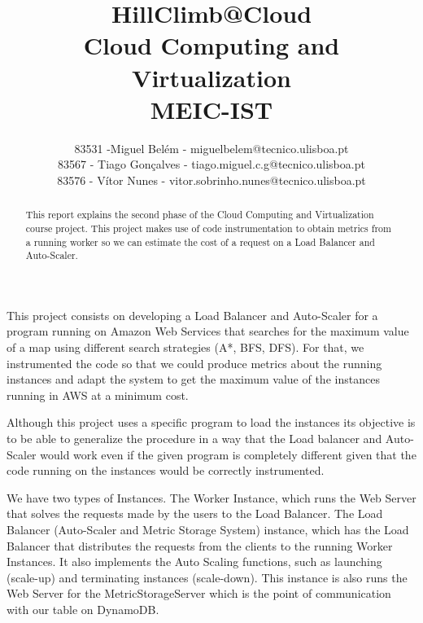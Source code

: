 \documentclass[times, 10pt,twocolumn]{article}
\begin{document}
\title{HillClimb@Cloud \\ Cloud Computing and Virtualization \\MEIC-IST }

\author{83531 -Miguel Belém - miguelbelem@tecnico.ulisboa.pt\\
83567 - Tiago Gonçalves - tiago.miguel.c.g@tecnico.ulisboa.pt\\
83576 - Vítor Nunes - vitor.sobrinho.nunes@tecnico.ulisboa.pt
}

\maketitle
\thispagestyle{empty}

\begin{abstract}
   This report explains the second phase of the Cloud Computing and Virtualization
   course project. This project makes use of code instrumentation to obtain metrics 
   from a running worker so we can estimate the cost of a request on a Load Balancer 
   and Auto-Scaler.
\end{abstract}

   This project consists on developing a Load Balancer and Auto-Scaler for 
   a program running on Amazon Web Services that searches for the maximum value 
   of a map using different search strategies (A*, BFS, DFS). For that, we instrumented
   the code so that we could produce metrics about the running instances and adapt the system 
   to get the maximum value of the instances running in AWS at a minimum cost.

   Although this project uses a specific program to load the instances its objective 
   is to be able to generalize the procedure in a way that the Load balancer and 
   Auto-Scaler would work even if the given program is completely different given
   that the code running on the instances would be correctly instrumented.


   We have two types of Instances. The Worker Instance, which runs the Web Server 
   that solves the requests made by the users to the Load Balancer. The Load Balancer 
   (Auto-Scaler and Metric Storage System) instance, which has the Load Balancer
   that distributes the requests from the clients to the running Worker Instances. 
   It also implements the Auto Scaling functions, such as launching (scale-up) and 
   terminating instances (scale-down). This instance is also runs the Web Server 
   for the MetricStorageServer which is the point of communication with our 
   table on DynamoDB.
\end{document}

